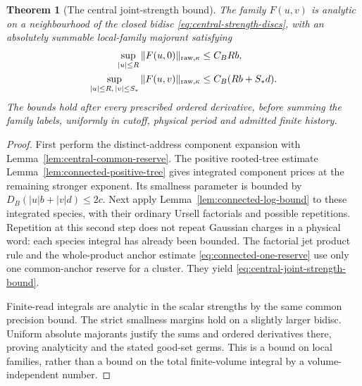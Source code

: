 \documentclass[11pt,reqno]{amsart}
\numberwithin{equation}{section}
\newtheorem{theorem}{Theorem}[section]
\theoremstyle{definition}
\theoremstyle{remark}
\begin{document}
\begin{theorem}[The central joint-strength bound]
\label{thm:central-joint-strength}
The family \(F(u,v)\) is analytic on a neighbourhood of the
closed bidisc \eqref{eq:central-strength-discs}, with an
absolutely summable local-family majorant satisfying
\begin{align}
 \sup_{|u|\le R}\|F(u,0)\|_{\mathrm{raw},\kappa}
                                      &\le C_BRb,\notag\\
 \sup_{|u|\le R,\,|v|\le S_*}
             \|F(u,v)\|_{\mathrm{raw},\kappa}
                                      &\le C_B(Rb+S_*d).
 \label{eq:central-joint-strength-bound}
\end{align}
The bounds hold after every prescribed ordered derivative,
before summing the family labels, uniformly in cutoff,
physical period and admitted finite history.
\end{theorem}
\begin{proof}
First perform the distinct-address component expansion
with Lemma~\ref{lem:central-common-reserve}. The positive
rooted-tree estimate
Lemma~\ref{lem:connected-positive-tree} gives integrated
component prices at the remaining stronger exponent.
Its smallness parameter is bounded by
\(D_B(|u|b+|v|d)\le2c\).
Next apply Lemma~\ref{lem:connected-log-bound} to these
integrated species, with their ordinary Ursell factorials
and possible repetitions. Repetition at this second step
does not repeat Gaussian charges in a physical word: each
species integral has already been bounded. The factorial
jet product rule and the whole-product anchor estimate
\eqref{eq:connected-one-reserve} use only one common-anchor
reserve for a cluster. They yield
\eqref{eq:central-joint-strength-bound}.

Finite-read integrals are analytic in the scalar strengths
by the same common precision bound. The strict smallness
margins hold on a slightly larger bidisc. Uniform absolute
majorants justify the sums and ordered derivatives there,
proving analyticity and the stated good-set germs. This is
a bound on local families, rather than a bound on the total
finite-volume integral by a volume-independent number.
\end{proof}
\end{document}
